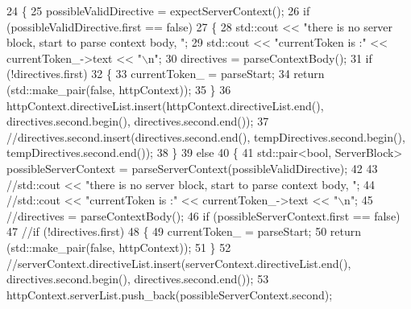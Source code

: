 \begin{DoxyCode}
24 \textcolor{comment}{                \{}
25 \textcolor{comment}{                    possibleValidDirective = expectServerContext();}
26 \textcolor{comment}{                    if (possibleValidDirective.first == false)}
27 \textcolor{comment}{                    \{}
28 \textcolor{comment}{                        std::cout << "there is no server block, start to parse context body, ";}
29 \textcolor{comment}{                        std::cout << "currentToken is :" << currentToken\_->text << "\(\backslash\)n";}
30 \textcolor{comment}{                        directives = parseContextBody();}
31 \textcolor{comment}{                        if (!directives.first)}
32 \textcolor{comment}{                        \{}
33 \textcolor{comment}{                            currentToken\_ = parseStart;}
34 \textcolor{comment}{                            return (std::make\_pair(false, httpContext));}
35 \textcolor{comment}{                        \}}
36 \textcolor{comment}{                        httpContext.directiveList.insert(httpContext.directiveList.end(),
       directives.second.begin(), directives.second.end());}
37 \textcolor{comment}{                        //directives.second.insert(directives.second.end(), tempDirectives.second.begin(),
       tempDirectives.second.end());}
38 \textcolor{comment}{                    \}}
39 \textcolor{comment}{                    else}
40 \textcolor{comment}{                    \{}
41 \textcolor{comment}{                        std::pair<bool, ServerBlock>    possibleServerContext =
       parseServerContext(possibleValidDirective);}
42 \textcolor{comment}{                        }
43 \textcolor{comment}{                        //std::cout << "there is no server block, start to parse context body, ";}
44 \textcolor{comment}{                        //std::cout << "currentToken is :" << currentToken\_->text << "\(\backslash\)n";}
45 \textcolor{comment}{                        //directives = parseContextBody();}
46 \textcolor{comment}{                        if (possibleServerContext.first == false)}
47 \textcolor{comment}{                        //if (!directives.first)}
48 \textcolor{comment}{                        \{}
49 \textcolor{comment}{                            currentToken\_ = parseStart;}
50 \textcolor{comment}{                            return (std::make\_pair(false, httpContext));}
51 \textcolor{comment}{                        \}}
52 \textcolor{comment}{                        //serverContext.directiveList.insert(serverContext.directiveList.end(),
       directives.second.begin(), directives.second.end());}
53 \textcolor{comment}{                        httpContext.serverList.push\_back(possibleServerContext.second);}

\end{DoxyCode}
